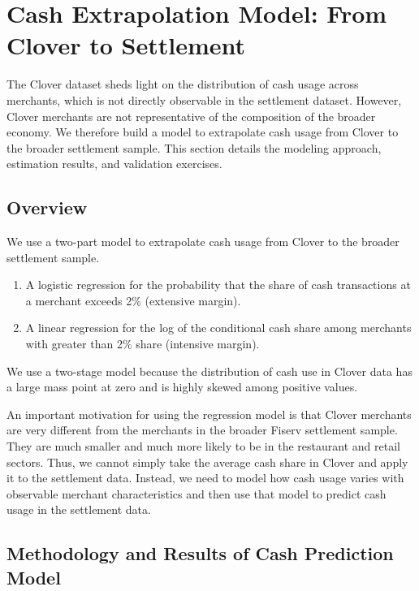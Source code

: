 \documentclass[11pt,english]{article}
\theoremstyle{remark}
\begin{document}
\clearpage

\clearpage{}


\section{Cash Extrapolation Model: From Clover to Settlement}
\label{sec:appendix-cash-model}

The Clover dataset sheds light on the distribution of cash usage across merchants, which is not directly observable in the settlement dataset.
However, Clover merchants are not representative of the composition of the broader economy.
We therefore build a model to extrapolate cash usage from Clover to the broader settlement sample.
This section details the modeling approach, estimation results, and validation exercises.

\subsection{Overview}

We use a two-part model to extrapolate cash usage from Clover to the broader settlement sample.

\begin{enumerate}
    \item A logistic regression for the probability that the share of cash transactions at a merchant exceeds 2\% (extensive margin).
    \item A linear regression for the log of the conditional cash share among merchants with greater than 2\% share (intensive margin).
\end{enumerate}
We use a two-stage model because the distribution of cash use in Clover data has a large mass point at zero and is highly skewed among positive values.

An important motivation for using the regression model is that Clover merchants are very different from the merchants in the broader Fiserv settlement sample.
They are much smaller and much more likely to be in the restaurant and retail sectors.
Thus, we cannot simply take the average cash share in Clover and apply it to the settlement data.
Instead, we need to model how cash usage varies with observable merchant characteristics and then use that model to predict cash usage in the settlement data.

\subsection{Methodology and Results of Cash Prediction Model}
\end{document}
